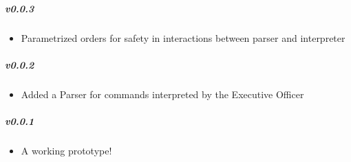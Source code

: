 \subparagraph{v0.0.3}

\begin{itemize}[noitemsep]
\item
  Parametrized orders for safety in interactions between parser and
  interpreter
\end{itemize}

\subparagraph{v0.0.2}

\begin{itemize}[noitemsep]
\item
  Added a Parser for commands interpreted by the Executive Officer
\end{itemize}

\subparagraph{v0.0.1}

\begin{itemize}[noitemsep]
\item
  A working prototype!
\end{itemize}
